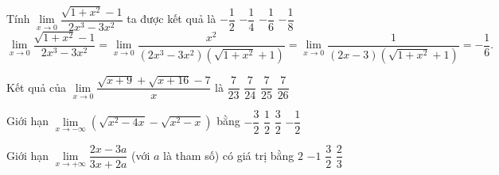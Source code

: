 \begin{ex}%
	Tính $\lim\limits_{x \to 0}\dfrac{\sqrt{1+x^2} - 1}{2x^3 - 3x^2}$ ta được kết quả là
	\choice
	{$-\dfrac{1}{2}$}
	{$-\dfrac{1}{4}$}
	{\True $-\dfrac{1}{6}$}
	{$-\dfrac{1}{8}$}
	\loigiai
	{
		$$\lim\limits_{x \to 0}\dfrac{\sqrt{1+x^2} - 1}{2x^3 - 3x^2} = \lim\limits_{x \to 0}\dfrac{x^2}{(2x^3 - 3x^2) \left(\sqrt{1+x^2} + 1\right)} = \lim\limits_{x \to 0}\dfrac{1}{(2x - 3) \left(\sqrt{1+x^2} + 1\right)} = -\dfrac{1}{6}.$$
	}
\end{ex}

\begin{ex}%
	Kết quả của $\lim \limits_{x \to 0} \dfrac{\sqrt {x + 9}  + \sqrt {x + 16}  - 7}{x}$ là
	\choice
	{$\dfrac{7}{23}$}
	{\True $\dfrac{7}{24}$}
	{$\dfrac{7}{25}$}
	{$\dfrac{7}{26}$}
\end{ex}

\begin{ex}%
	Giới hạn $\lim\limits_{x \to -\infty} \left(\sqrt{x^2-4x}-\sqrt{x^2-x}\right)$ bằng
	\choice
	{$-\dfrac{3}{2}$}
	{$\dfrac{1}{2}$}
	{\True $\dfrac{3}{2}$}
	{$-\dfrac{1}{2}$}
\end{ex}

\begin{ex}%
	Giới hạn $ \lim\limits_{x\to +\infty}\dfrac{2x-3a}{3x+2a} $ (với $ a $ là tham số) có giá trị bằng
	\choice
	{$2$}
	{$-1$}
	{$\dfrac{3}{2}$}
	{\True $\dfrac{2}{3}$}
\end{ex}

